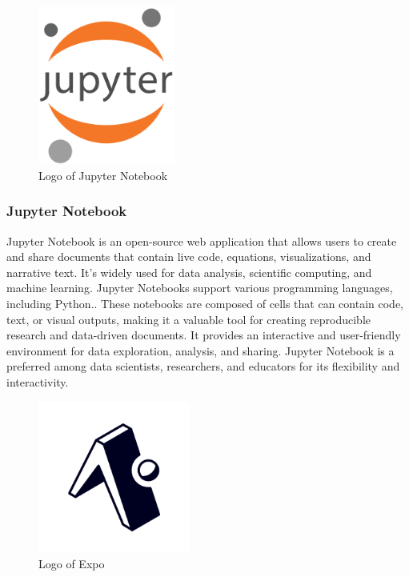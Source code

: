 \documentclass[conference]{IEEEtran}
\begin{document}
        \begin{figure}[htbp]
        \centerline{\includegraphics[width=4.5cm]{Images/logo/jupyter.png}}
        \label{fig}
        \caption{Logo of Jupyter Notebook}
        \end{figure}
        \subsubsection{Jupyter Notebook}
        Jupyter Notebook is an open-source web application that allows users to create and share documents that contain live code, equations, visualizations, and narrative text. It's widely used for data analysis, scientific computing, and machine learning. Jupyter Notebooks support various programming languages, including Python.. These notebooks are composed of cells that can contain code, text, or visual outputs, making it a valuable tool for creating reproducible research and data-driven documents. It provides an interactive and user-friendly environment for data exploration, analysis, and sharing. Jupyter Notebook is a preferred among data scientists, researchers, and educators for its flexibility and interactivity.\\

        \begin{figure}[htbp]
        \centerline{\includegraphics[width=5cm]{Images/logo/expo.png}}
        \label{fig}
        \caption{Logo of Expo}
        \end{figure}
\end{document}
